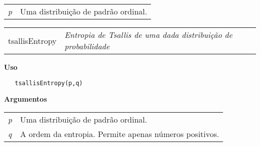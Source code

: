 \begin{table}[!ht]
\begin{center}
\begin{tabularx}{\textwidth}{X X}
\hspace{0.5cm} \textit{p} & Uma distribuição de padrão ordinal.\\
\end{tabularx}
\end{center}
\end{table} 

\hrulefill   

\begin{table}[!ht]
\begin{center}
\begin{tabularx}{\textwidth}{ X X}
\hspace{0.5cm} tsallisEntropy & \textit{Entropia de Tsallis de uma dada distribuição de probabilidade}\\
\end{tabularx}
\end{center}
\end{table} 

\vspace{-0.5cm}

\hrulefill  

\vspace{0.5cm}

\textbf{Uso}

\begin{lstlisting}
   tsallisEntropy(p,q)
\end{lstlisting}

\vspace{0.5cm}

\textbf{Argumentos}

\begin{table}[!ht]
\begin{center}
\begin{tabularx}{\textwidth}{X X}
\hspace{0.5cm} \textit{p} \vspace{0.5cm}& Uma distribuição de padrão ordinal.\vspace{0.5cm}\\
\hspace{0.5cm} \textit{q} \vspace{0.5cm}& A ordem da entropia. Permite apenas números positivos.\vspace{0.5cm}\\
\end{tabularx}
\end{center}
\end{table} 

